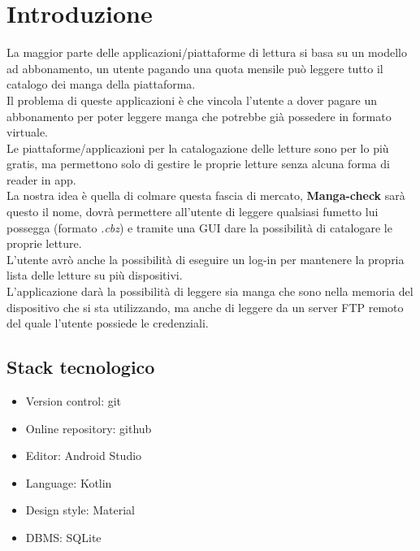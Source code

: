 \documentclass[../Assignment-3-LPSMT.tex]{subfiles}
\begin{document}
\chapter{Introduzione}

La maggior parte delle applicazioni/piattaforme di lettura si basa su un
modello ad abbonamento, un utente pagando una quota mensile può leggere
tutto il catalogo dei manga della piattaforma.\\
Il problema di queste applicazioni è che vincola l'utente a dover pagare
un abbonamento per poter leggere manga che potrebbe già possedere in
formato virtuale.\\
Le piattaforme/applicazioni per la catalogazione delle letture sono per
lo più gratis, ma permettono solo di gestire le proprie letture senza
alcuna forma di reader in app.\\
La nostra idea è quella di colmare questa fascia di mercato,
\textbf{Manga-check} sarà questo il nome, dovrà permettere all'utente di
leggere qualsiasi fumetto lui possegga (formato \emph{.cbz}) e tramite una GUI
dare la possibilità di catalogare le proprie letture.\\
L'utente avrò anche la possibilità di eseguire un log-in per mantenere
la propria lista delle letture su più dispositivi.\\
L'applicazione darà la possibilità di leggere sia manga che sono nella
memoria del dispositivo che si sta utilizzando, ma anche di leggere da
un server FTP remoto del quale l'utente possiede le credenziali.

\section{Stack tecnologico}
\begin{itemize}
	\item Version control: git
	\item Online repository: github
	\item Editor: Android Studio
	\item Language: Kotlin
	\item Design style: Material
	\item DBMS: SQLite
\end{itemize}
\end{document}
